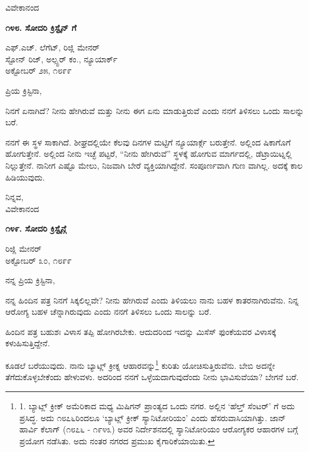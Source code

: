 \begin{center}
ವಿವೇಕಾನಂದ
\end{center}

\begin{center}
\textbf{೧೪೮. ಸೋದರಿ ಕ್ರಿಸ್ಟೈನ್ ಗೆ}
\end{center}

\begin{flushright}
 ಎಫ್.ಎಚ್. ಲೆಗೆಟ್, ರಿಜ್ಲಿ ಮೇನರ್\\ಸ್ಟೋನ್ ರಿಜ್, ಅಲ್ಸ್ಟರ್ ಕಂ., ನ್ಯೂಯಾರ್ಕ್\\ಅಕ್ಟೋಬರ್ ೨೫, ೧೮೯೯
\end{flushright}

ಪ್ರಿಯ ಕ್ರಿಸ್ಟಿನಾ,

ನಿನಗೆ ಏನಾಗಿದೆ? ನೀನು ಹೇಗಿರುವೆ ಮತ್ತು ನೀನು ಈಗ ಏನು ಮಾಡುತ್ತಿರುವೆ ಎಂದು ನನಗೆ ತಿಳಿಸಲು ಒಂದು ಸಾಲನ್ನು ಬರೆ.

ನನಗೆ ಈ ಸ್ಥಳ ಸಾಕಾಗಿದೆ. ಶೀಘ್ರದಲ್ಲಿಯೇ ಕೆಲವು ದಿನಗಳ ಮಟ್ಟಿಗೆ ನ್ಯೂಯಾರ್ಕ್ಗೆ ಬರುತ್ತೇನೆ. ಅಲ್ಲಿಂದ ಷಿಕಾಗೊಗೆ ಹೋಗುತ್ತೇನೆ. ಅಲ್ಲಿಂದ ನೀನು ಇಚ್ಛೆ ಪಟ್ಟರೆ, “ನೀನು ಹೇಗಿರುವೆ” ಸ್ಥಳಕ್ಕೆ ಹೋಗುವ ಮಾರ್ಗದಲ್ಲಿ, ಡೆಟ್ರಾಯಿಟ್ನಲ್ಲಿ ನಿಲ್ಲುತ್ತೇನೆ. ನಾನೀಗ ಎಷ್ಟೊ ಮೇಲು, ನಿಜವಾಗಿ ಬೇರೆ ವ್ಯಕ್ತಿಯಾಗಿದ್ದೇನೆ. ಸಂಪೂರ್ಣವಾಗಿ ಗುಣ ವಾಗಿಲ್ಲ. ಅದಕ್ಕೆ ಕಾಲ ಹಿಡಿಯುವುದು.

\begin{flushright}
ನಿನ್ನವ,\\ವಿವೇಕಾನಂದ
\end{flushright}

\begin{center}
\textbf{೧೪೯. ಸೋದರಿ ಕ್ರಿಸ್ಟೈನ್ಗೆ}
\end{center}

\begin{flushright}
ರಿಜ್ಲಿ ಮೇನರ್\\ಅಕ್ಟೋಬರ್ ೩೦, ೧೮೯೯
\end{flushright}

ನನ್ನ ಪ್ರಿಯ ಕ್ರಿಸ್ಟಿನಾ,

ನನ್ನ ಹಿಂದಿನ ಪತ್ರ ನಿನಗೆ ಸಿಕ್ಕಲಿಲ್ಲವೇ? ನೀನು ಹೇಗಿರುವೆ ಎಂದು ತಿಳಿಯಲು ನಾನು ಬಹಳ ಕಾತರನಾಗಿರುವೆನು. ನಿನ್ನ ಆರೋಗ್ಯ ಬಹಳ ಚೆನ್ನಾಗಿರುವುದು ಎಂದು ನನಗೆ ತಿಳಿಸಲು ಒಂದು ಸಾಲನ್ನು ಬರೆ.

ಹಿಂದಿನ ಪತ್ರ ಬಹುಶಃ ವಿಳಾಸ ತಪ್ಪಿ ಹೋಗಿರಬೇಕು. ಆದುದರಿಂದ ಇದನ್ನು ಮಿಸೆಸ್ ಫುಂಕೆಯವರ ವಿಳಾಸಕ್ಕೆ ಕಳುಹಿಸುತ್ತಿದ್ದೇನೆ.

ಕೂಡಲೆ ಬರೆಯುವುದು. ನಾನು ಬ್ಯಾಟ್ಲ್ ಕ್ರೀಕ್ನ ಆಹಾರವನ್ನು\footnote{1. ಬ್ಯಾಟ್ಲ್ ಕ್ರೀಕ್ ಅಮೆರಿಕಾದ ಮಧ್ಯ ಮಿಷಿಗನ್ ಪ್ರಾಂತ್ಯದ ಒಂದು ನಗರ. ಅಲ್ಲಿನ ‘ಹೆಲ್ತ್ ಸೆಂಟರ್’ ಗೆ ಅದು ಪ್ರಸಿದ್ಧ. ಅದು ೧೮೭೬ರಿಂದಲೂ ‘ಬ್ಯಾಟ್ಲ್ ಕ್ರೀಕ್ ಸ್ಯಾನಿಟೋರಿಯಂ’ ಎಂದು ಹೆಸರುವಾಸಿಯಾಗಿತ್ತು. ಜಾನ್ ಹಾರ್ವಿ ಕೆಲಾಗ್ (೧೮೭೬ - ೧೯೪೩) ಅವರ ನಿರ್ದೇಶನದಲ್ಲಿ ಸ್ಯಾನಿಟೋರಿಯಂ ಆರೋಗ್ಯಕರ ಆಹಾರಗಳ ಬಗ್ಗೆ ಪ್ರಯೋಗ ನಡೆಸಿತು. ಅದು ನಂತರ ನಗರದ ಪ್ರಮುಖ ಕೈಗಾರಿಕೆಯಾಯಿತು.} ಕುರಿತು ಯೋಚಿಸುತ್ತಿರುವೆನು. ಬೇಬಿ ಅದನ್ನೇ ತೆಗೆದುಕೊಳ್ಳಬೇಕೆಂದು ಹೇಳುವಳು. ಅದರಿಂದ ನನಗೆ ಒಳ್ಳೆಯದಾಗುವುದೆಂದು ನೀನು ಭಾವಿಸುವೆಯಾ? ಬೇಗನೆ ಬರೆ.

